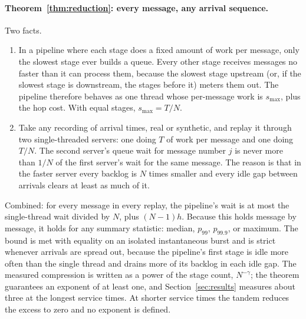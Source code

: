 \documentclass[11pt]{article}
\begin{document}
\paragraph{Theorem~\ref{thm:reduction}: every message, any arrival sequence.} Two
facts.
\begin{enumerate}
    \item In a pipeline where each stage does a fixed amount of work per message, only the
slowest stage ever builds a queue. Every other stage receives messages no faster than it
can process them, because the slowest stage upstream (or, if the slowest stage is
downstream, the stages before it) meters them out. The pipeline therefore behaves as one thread whose per-message work is $s_{\max}$,
plus the hop cost. With equal stages, $s_{\max} = T/N$.
    \item Take any recording of arrival times, real or synthetic, and replay it through
two single-threaded servers: one doing $T$ of work per message and one doing $T/N$. The
second server's queue wait for message number $j$ is never more than $1/N$ of the first
server's wait for the same message. The reason is that in the faster server every backlog
is $N$ times smaller and every idle gap between arrivals clears at least as much of it.
\end{enumerate}
Combined: for every message in every replay, the pipeline's wait is at most the
single-thread wait divided by $N$, plus $(N-1)h$. Because this holds message by message,
it holds for any summary statistic: median, $p_{99}$, $p_{99.9}$, or maximum. The bound
is met with equality on an isolated instantaneous burst and is strict whenever arrivals
are spread out, because the pipeline's first stage is idle more often than the single
thread and drains more of its backlog in each idle gap. The measured compression is
written as a power of the stage count, $N^{-\gamma}$; the theorem guarantees an exponent
of at least one, and Section~\ref{sec:results} measures about three at the longest service
times. At shorter service times the tandem reduces the excess to zero and no exponent is
defined.
\end{document}
